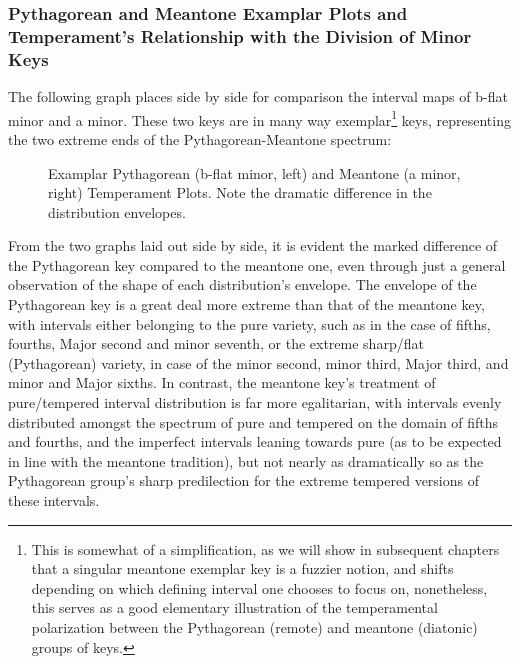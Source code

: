 \subsubsection{Pythagorean and Meantone Examplar Plots and Temperament's
Relationship with the Division of Minor
Keys}\label{pythagorean-and-meantone-examplar-plots-and-temperaments-relationship-with-the-division-of-minor-keys}

The following graph places side by side for comparison the interval maps
of b-flat minor and a minor. These two keys are in many way
exemplar\footnote{This is somewhat of a simplification, as we will show in subsequent chapters that a singular meantone exemplar key is a fuzzier notion, and shifts depending on which defining interval one chooses to focus on, nonetheless, this serves as a good elementary illustration of the temperamental polarization between the Pythagorean (remote) and meantone (diatonic) groups of keys.}
keys, representing the two extreme ends of the Pythagorean-Meantone
spectrum:



\begin{figure}[H]
    \begin{center}
    \caption[Examplar Pythagorean (b-flat minor) and Meantone (a minor) Temperament Plots. ]{ Examplar Pythagorean (b-flat minor, left) and Meantone (a minor, right) Temperament Plots. Note the dramatic difference in the distribution envelopes.}
    \end{center}
\end{figure}
    
    From the two graphs laid out side by side, it is evident the marked
difference of the Pythagorean key compared to the meantone one, even
through just a general observation of the shape of each distribution's
envelope. The envelope of the Pythagorean key is a great deal more
extreme than that of the meantone key, with intervals either belonging
to the pure variety, such as in the case of fifths, fourths, Major
second and minor seventh, or the extreme sharp/flat (Pythagorean)
variety, in case of the minor second, minor third, Major third, and
minor and Major sixths. In contrast, the meantone key's treatment of
pure/tempered interval distribution is far more egalitarian, with
intervals evenly distributed amongst the spectrum of pure and tempered
on the domain of fifths and fourths, and the imperfect intervals leaning
towards pure (as to be expected in line with the meantone tradition),
but not nearly as dramatically so as the Pythagorean group's sharp
predilection for the extreme tempered versions of these intervals.

